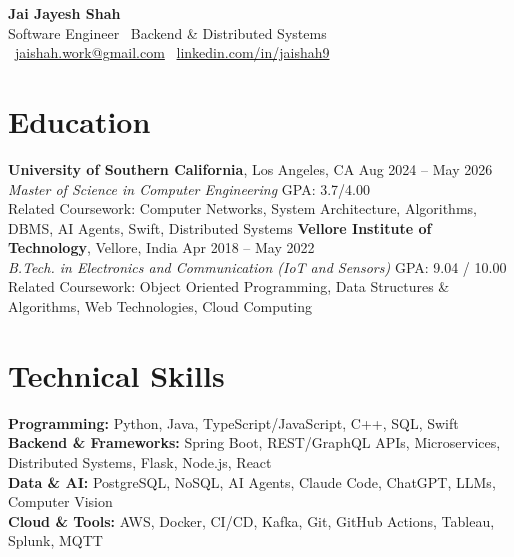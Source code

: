 \documentclass[letterpaper,11pt]{article}
\begin{document}
\begin{center}
    {\LARGE \textbf{Jai Jayesh Shah}}\\
    {\normalsize Software Engineer \textbar\ Backend \& Distributed Systems}\\
    \small
    \faEnvelope\ \href{mailto:jaishah.work@gmail.com}{jaishah.work@gmail.com}
    \quad
    \faLinkedin\ \href{https://www.linkedin.com/in/jaishah9}{linkedin.com/in/jaishah9}
\end{center}
\vspace{-13pt}


\section*{Education}
\textbf{University of Southern California}, Los Angeles, CA \hfill Aug 2024 -- May 2026 \\
\textit{Master of Science in Computer Engineering} \hfill GPA: 3.7/4.00 \\
Related Coursework: Computer Networks, System Architecture, Algorithms, DBMS, AI Agents, Swift, Distributed Systems
\textbf{Vellore Institute of Technology}, Vellore, India \hfill Apr 2018 -- May 2022 \\
\textit{B.Tech. in Electronics and Communication (IoT and Sensors)} \hfill GPA: 9.04 / 10.00 \\
Related Coursework: Object Oriented Programming, Data Structures \& Algorithms, Web Technologies, Cloud Computing

\section*{Technical Skills}
\textbf{Programming:} Python, Java, TypeScript/JavaScript, C++, SQL, Swift \\
\textbf{Backend \& Frameworks:} Spring Boot, REST/GraphQL APIs, Microservices, Distributed Systems, Flask, Node.js, React \\
\textbf{Data \& AI:} PostgreSQL, NoSQL, AI Agents, Claude Code, ChatGPT, LLMs, Computer Vision \\
\textbf{Cloud \& Tools:} AWS, Docker, CI/CD, Kafka, Git, GitHub Actions, Tableau, Splunk, MQTT

\end{document}
